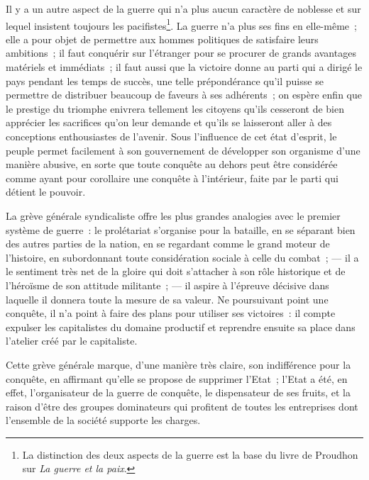 \documentclass[french,twoside]{book} %
\begin{document}
Il y a un autre aspect de la guerre qui n’a plus aucun caractère de noblesse et sur lequel insistent toujours les pacifistes\footnote{ \noindent La distinction des deux aspects de la guerre est la base du livre de Proudhon sur \emph{La guerre et la paix}.
 }. La guerre n’a plus ses fins en elle-même ; elle a pour objet de permettre aux hommes politiques de satisfaire leurs ambitions ; il faut conquérir sur l’étranger pour se procurer de grands avantages matériels et immédiats ; il faut aussi que la victoire donne au parti qui a dirigé le pays pendant les temps de succès, une telle prépondérance qu’il puisse se permettre de distribuer beaucoup de faveurs à ses adhérents ; on espère enfin que le prestige du triomphe enivrera tellement les citoyens qu’ils cesseront de bien apprécier les sacrifices qu’on leur demande et qu’ils se laisseront aller à des conceptions enthousiastes de l’avenir. Sous l’influence de cet état d’esprit, le peuple permet facilement à son gouvernement de développer son organisme d’une manière abusive, en sorte que toute conquête au dehors peut être considérée comme ayant pour corollaire une conquête à l’intérieur, faite par le parti qui détient le pouvoir.\par
La grève générale syndicaliste offre les plus grandes analogies avec le premier système de guerre : le prolétariat s’organise pour la bataille, en se séparant bien des  autres parties de la nation, en se regardant comme le grand moteur de l’histoire, en subordonnant toute considération sociale à celle du combat ; — il a le sentiment très net de la gloire qui doit s’attacher à son rôle historique et de l’héroïsme de son attitude militante ; — il aspire à l’épreuve décisive dans laquelle il donnera toute la mesure de sa valeur. Ne poursuivant point une conquête, il n’a point à faire des plans pour utiliser ses victoires : il compte expulser les capitalistes du domaine productif et reprendre ensuite sa place dans l’atelier créé par le capitaliste.\par
Cette grève générale marque, d’une manière très claire, son indifférence pour la conquête, en affirmant qu’elle se propose de supprimer l’Etat ; l’Etat a été, en effet, l’organisateur de la guerre de conquête, le dispensateur de ses fruits, et la raison d’être des groupes dominateurs qui profitent de toutes les entreprises dont l’ensemble de la société supporte les charges.\par
\end{document}
